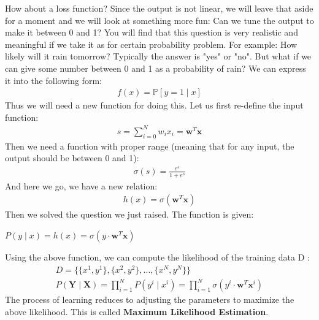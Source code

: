 \documentclass{article}
\begin{document}
How about a loss function? Since the output is not linear, we will leave that aside for a moment and we will look at something more fun: Can we tune the output to make it between 0 and 1? You will find that this question is very realistic and meaningful if we take it as for certain probability problem. For example: How likely will it rain tomorrow? Typically the answer is "yes" or "no". But what if we can give some number between 0 and 1 as a probability of rain? We can express it into the following form:
\begin{align*}
    f(x) = \mathbb{P}\left[ y=1 \mid x \right]
\end{align*}
Thus we will need a new function for doing this. Let us first re-define the input function:
\begin{align*}
    s = \sum_{i=0}^{N}w_{i}x_{i} = \bm{w}^{T}\bm{x}
\end{align*}
Then we need a function with proper range (meaning that for any input, the output should be between 0 and 1):
\begin{align*}
    \sigma(s) = \frac{e^{s}}{1+e^{s}}
\end{align*}
And here we go, we have a new relation:
\begin{align*}
    h(x) = \sigma(\bm{w}^{T}\bm{x})
\end{align*}
Then we solved the question we just raised. The function is given:
\begin{tcolorbox}[colback=yellow!20, colframe=yellow!90, title=General Logistic Regression, coltitle=black]
     $P(y \mid x) = h(x) = \sigma(y \cdot \bm{w}^{T}\bm{x})$
\end{tcolorbox}
Using the above function, we can compute the likelihood of the training data D :
\begin{align*}
    D = \{ \{x^{1}, y^{1}\}, \{x^{2}, y^{2}\}, ..., \{x^{N}, y^{N}\} \}\\
    P(\mathbf{Y} \mid \mathbf{X}) = \prod_{i=1}^{N}P(y^{i} \mid x^{i}) = \prod_{i=1}^{N}\sigma(y^{i} \cdot \bm{w}^{T}\bm{x}^{i})
\end{align*}
The process of learning reduces to adjusting the parameters to maximize the above likelihood. This is called \textbf{Maximum Likelihood Estimation}.
\end{document}
